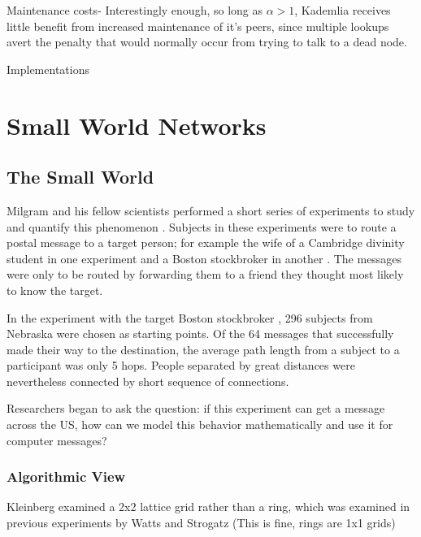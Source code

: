 \documentclass[10pt,letterpaper]{report}
\begin{document}
Maintenance costs-  Interestingly enough, so long as $\alpha >1$, Kademlia receives little benefit from increased maintenance of it's peers, since multiple lookups avert the penalty that would normally occur from trying to talk to a dead node.


Implementations


\chapter{Small World Networks}
\section{The Small World}


Milgram and his fellow scientists performed a short series of experiments to study and quantify this phenomenon \cite{milgram1967small}.  
Subjects in these experiments were to route a postal message to a target person; for example the wife of a Cambridge divinity student in one experiment and a Boston stockbroker in another \cite{milgram1967small}.
The messages were only to be routed by forwarding them to a friend they thought most likely to know the target.

In the experiment with the target Boston stockbroker \cite{travers1969experimental}, 296 subjects from Nebraska were chosen as starting points.
Of the 64 messages that successfully made their way to the destination, the average path length from a subject to a participant was only 5 hops.  
People separated by great distances were nevertheless connected by short sequence of connections.

Researchers began to ask the question: if this experiment can get a message across the US, how can we model this behavior mathematically and use it for computer messages?


\subsection{Algorithmic View}


\cite{watts1998collective} 


Kleinberg examined a 2x2 lattice grid rather than a ring, which was examined in previous experiments by Watts and Strogatz  \cite{watts1998collective}
 (This is fine, rings are 1x1 grids)

\end{document}
